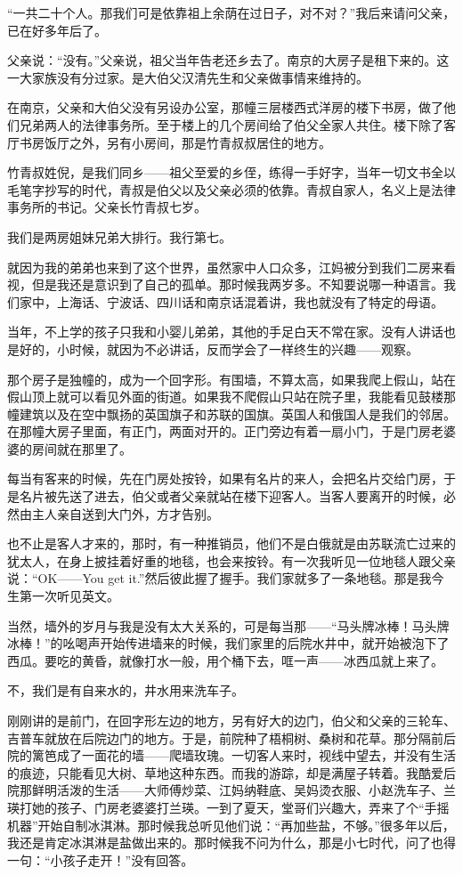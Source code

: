 \par “一共二十个人。那我们可是依靠祖上余荫在过日子，对不对？”我后来请问父亲，已在好多年后了。
\par 父亲说：“没有。”父亲说，祖父当年告老还乡去了。南京的大房子是租下来的。这一大家族没有分过家。是大伯父汉清先生和父亲做事情来维持的。
\par 在南京，父亲和大伯父没有另设办公室，那幢三层楼西式洋房的楼下书房，做了他们兄弟两人的法律事务所。至于楼上的几个房间给了伯父全家人共住。楼下除了客厅书房饭厅之外，另有小房间，那是竹青叔叔居住的地方。
\par 竹青叔姓倪，是我们同乡——祖父至爱的乡侄，练得一手好字，当年一切文书全以毛笔字抄写的时代，青叔是伯父以及父亲必须的依靠。青叔自家人，名义上是法律事务所的书记。父亲长竹青叔七岁。
\par 我们是两房姐妹兄弟大排行。我行第七。
\par 就因为我的弟弟也来到了这个世界，虽然家中人口众多，江妈被分到我们二房来看视，但是我还是意识到了自己的孤单。那时候我两岁多。不知要说哪一种语言。我们家中，上海话、宁波话、四川话和南京话混着讲，我也就没有了特定的母语。
\par 当年，不上学的孩子只我和小婴儿弟弟，其他的手足白天不常在家。没有人讲话也是好的，小时候，就因为不必讲话，反而学会了一样终生的兴趣——观察。
\par 那个房子是独幢的，成为一个回字形。有围墙，不算太高，如果我爬上假山，站在假山顶上就可以看见外面的街道。如果我不爬假山只站在院子里，我能看见鼓楼那幢建筑以及在空中飘扬的英国旗子和苏联的国旗。英国人和俄国人是我们的邻居。在那幢大房子里面，有正门，两面对开的。正门旁边有着一扇小门，于是门房老婆婆的房间就在那里了。
\par 每当有客来的时候，先在门房处按铃，如果有名片的来人，会把名片交给门房，于是名片被先送了进去，伯父或者父亲就站在楼下迎客人。当客人要离开的时候，必然由主人亲自送到大门外，方才告别。
\par 也不止是客人才来的，那时，有一种推销员，他们不是白俄就是由苏联流亡过来的犹太人，在身上披挂着好重的地毯，也会来按铃。有一次我听见一位地毯人跟父亲说：“OK——You get it.”然后彼此握了握手。我们家就多了一条地毯。那是我今生第一次听见英文。
\par 当然，墙外的岁月与我是没有太大关系的，可是每当那——“马头牌冰棒！马头牌冰棒！”的吆喝声开始传进墙来的时候，我们家里的后院水井中，就开始被泡下了西瓜。要吃的黄昏，就像打水一般，用个桶下去，哐一声——冰西瓜就上来了。
\par 不，我们是有自来水的，井水用来洗车子。
\par 刚刚讲的是前门，在回字形左边的地方，另有好大的边门，伯父和父亲的三轮车、吉普车就放在后院边门的地方。于是，前院种了梧桐树、桑树和花草。那分隔前后院的篱笆成了一面花的墙——爬墙玫瑰。一切客人来时，视线中望去，并没有生活的痕迹，只能看见大树、草地这种东西。而我的游踪，却是满屋子转着。我酷爱后院那鲜明活泼的生活——大师傅炒菜、江妈纳鞋底、吴妈烫衣服、小赵洗车子、兰瑛打她的孩子、门房老婆婆打兰瑛。一到了夏天，堂哥们兴趣大，弄来了个“手摇机器”开始自制冰淇淋。那时候我总听见他们说：“再加些盐，不够。”很多年以后，我还是肯定冰淇淋是盐做出来的。那时候我不问为什么，那是小七时代，问了也得一句：“小孩子走开！”没有回答。
